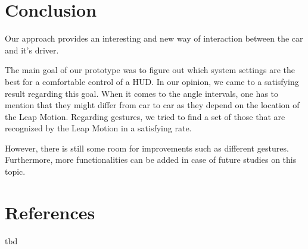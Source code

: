 \documentclass{sigchi-ext}
\begin{document}
\section{Conclusion}
Our approach provides an interesting and new way of interaction between the car and it's driver. 

The main goal of our prototype was to figure out which system settings are the best for a comfortable control of a HUD. In our opinion, we came to a satisfying result regarding this goal. When it comes to the angle intervals, one has to mention that they might differ from car to car as they depend on the location of the Leap Motion. Regarding gestures, we tried to find a set of those that are recognized by the Leap Motion in a satisfying rate.

However, there is still some room for improvements such as different gestures. Furthermore, more functionalities can be added in case of future studies on this topic.

\section{References}
tbd



\end{document}
